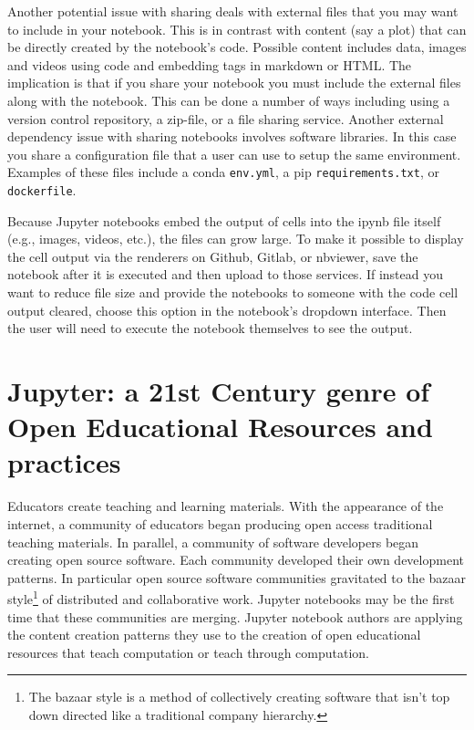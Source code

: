 \documentclass[]{book}
\let\rmarkdownfootnote\footnote%
\def\footnote{\protect\rmarkdownfootnote}
\begin{document}
Another potential issue with sharing deals with external files that you
may want to include in your notebook. This is in contrast with content
(say a plot) that can be directly created by the notebook's code.
Possible content includes data, images and videos using code and
embedding tags in markdown or HTML. The implication is that if you share
your notebook you must include the external files along with the
notebook. This can be done a number of ways including using a version
control repository, a zip-file, or a file sharing service. Another
external dependency issue with sharing notebooks involves software
libraries. In this case you share a configuration file that a user can
use to setup the same environment. Examples of these files include a
conda \texttt{env.yml}, a pip \texttt{requirements.txt}, or
\texttt{dockerfile}.

Because Jupyter notebooks embed the output of cells into the ipynb file
itself (e.g., images, videos, etc.), the files can grow large. To make
it possible to display the cell output via the renderers on Github,
Gitlab, or nbviewer, save the notebook after it is executed and then
upload to those services. If instead you want to reduce file size and
provide the notebooks to someone with the code cell output cleared,
choose this option in the notebook's dropdown interface. Then the user
will need to execute the notebook themselves to see the output.

\section{Jupyter: a 21st Century genre of Open Educational Resources and
practices}\label{jupyter-a-21st-century-genre-of-open-educational-resources-and-practices}

Educators create teaching and learning materials. With the appearance of
the internet, a community of educators began producing open access
traditional teaching materials. In parallel, a community of software
developers began creating open source software. Each community developed
their own development patterns. In particular open source software
communities gravitated to the bazaar style\footnote{The bazaar style is
  a method of collectively creating software that isn't top down
  directed like a traditional company hierarchy.} of distributed and
collaborative work. Jupyter notebooks may be the first time that these
communities are merging. Jupyter notebook authors are applying the
content creation patterns they use to the creation of open educational
resources that teach computation or teach through computation.
\end{document}
